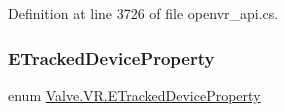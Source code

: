 Definition at line 3726 of file openvr\+\_\+api.\+cs.

\mbox{\label{namespace_valve_1_1_v_r_ab060521ead7273986988fc4897e52482}} 
\subsubsection{\texorpdfstring{ETrackedDeviceProperty}{ETrackedDeviceProperty}}
{\footnotesize\ttfamily enum \mbox{\hyperlink{namespace_valve_1_1_v_r_ab060521ead7273986988fc4897e52482}{Valve.\+V\+R.\+E\+Tracked\+Device\+Property}}\hspace{0.3cm}{\ttfamily [strong]}}

